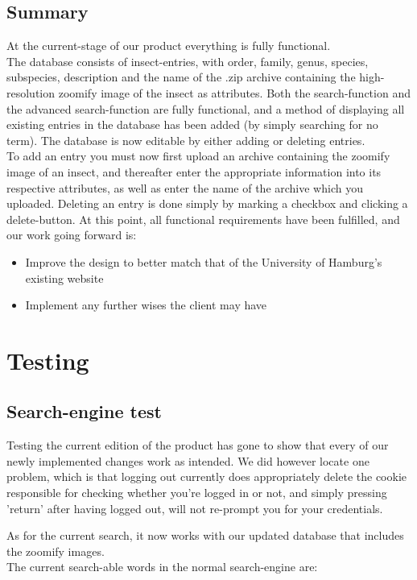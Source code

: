 \documentclass[12pt,a4paper]{article}
\begin{document}
\subsection{Summary}

At the current-stage of our product everything is fully functional.\\
The database consists of insect-entries, with order, family, genus, species, subspecies, description and the name of the .zip archive containing the high-resolution zoomify image of the insect as attributes.
Both the search-function and the advanced search-function are fully functional, and a method of displaying all existing entries in the database has been added (by simply searching for no term).
The database is now editable by either adding or deleting entries.\\
To add an entry you must now first upload an archive containing the zoomify image of an insect, and thereafter enter the appropriate information into its respective attributes, as well as enter the name of the archive which you uploaded.
Deleting an entry is done simply by marking a checkbox and clicking a delete-button.
At this point, all functional requirements have been fulfilled, and our work going forward is:
\begin{itemize}
\item Improve the design to better match that of the University of Hamburg's existing website
\item Implement any further wises the client may have
\end{itemize}
\newpage
\section{Testing}
\subsection{Search-engine test}

Testing the current edition of the product has gone to show that every of our newly implemented changes work as intended. We did however locate one problem, which is that logging out currently does appropriately delete the cookie responsible for checking whether you're logged in or not, and simply pressing 'return' after having logged out, will not re-prompt you for your credentials.

As for the current search, it now works with our updated database that includes the zoomify images.\\
The current search-able words in the normal search-engine are:
\end{document}
